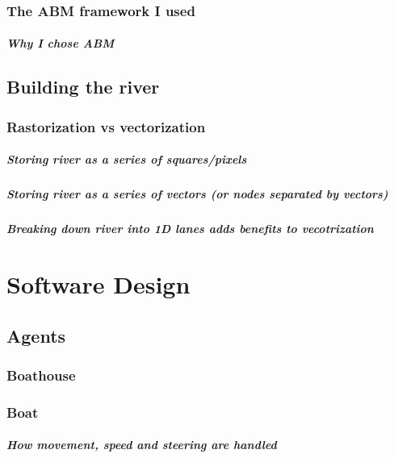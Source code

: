     \subsection{The ABM framework I used}
      \paragraph{Why I chose ABM}
  
  \section{Building the river}
    \subsection{Rastorization vs vectorization}
      \paragraph{Storing river as a series of squares/pixels}
      \paragraph{Storing river as a series of vectors (or nodes separated by vectors)}
      \paragraph{Breaking down river into 1D lanes adds benefits to vecotrization}
\chapter{Software Design}

\section{Agents}
  \subsection{Boathouse}
  
  \subsection{Boat}
    
    \paragraph{How movement, speed and steering are handled}
    
